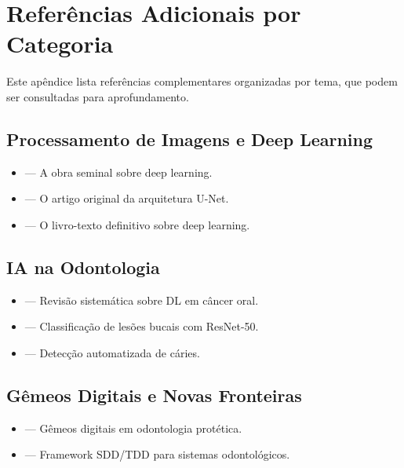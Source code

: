 \chapter{Referências Adicionais por Categoria}
\label{apendice:referencias}

Este apêndice lista referências complementares organizadas por tema,
que podem ser consultadas para aprofundamento.

\section{Processamento de Imagens e Deep Learning}

\begin{itemize}
  \item \cite{lecun2015deep} — A obra seminal sobre deep learning.
  \item \cite{ronneberger2015u} — O artigo original da arquitetura U-Net.
  \item \cite{goodfellow2016deep} — O livro-texto definitivo sobre deep learning.
\end{itemize}

\section{IA na Odontologia}

\begin{itemize}
  \item \cite{arnet2022cancer} — Revisão sistemática sobre DL em câncer oral.
  \item \cite{oliveira2020lesoes} — Classificação de lesões bucais com ResNet-50.
  \item \cite{silva2017caries} — Detecção automatizada de cáries.
\end{itemize}

\section{Gêmeos Digitais e Novas Fronteiras}

\begin{itemize}
  \item \cite{joda2023twins} — Gêmeos digitais em odontologia protética.
  \item \cite{claro2024framework} — Framework SDD/TDD para sistemas odontológicos.
\end{itemize}

